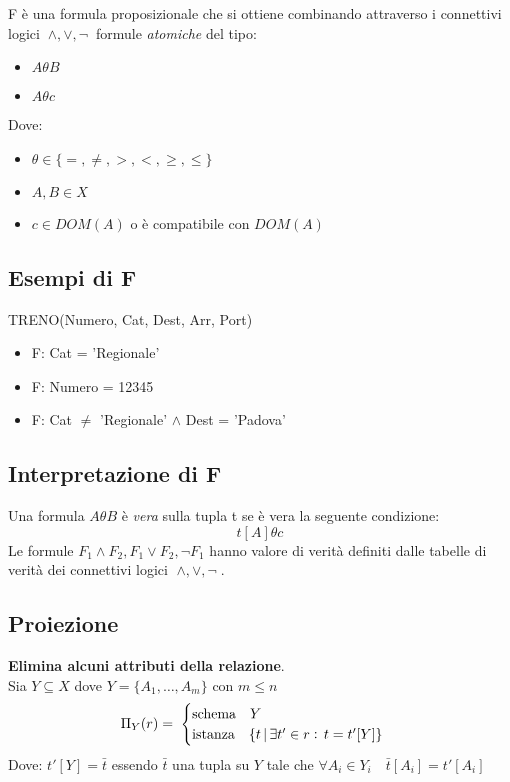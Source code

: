 \documentclass[a4paper, 10pt]{article}
\theoremstyle{definition}
\begin{document}
		F è una formula proposizionale che si ottiene combinando attraverso i connettivi logici $\: \wedge, \vee, \neg \:$ formule \emph{atomiche} del tipo:

			\begin{itemize}
				\item $A \theta B$
				\item $A \theta c$
			\end{itemize}		
			Dove:
			
			\begin{itemize}
				\item $\theta \in \{ =, \neq, >, <,  \geq, \leq \}$
				\item $A, B \in X$
				\item $c \in DOM(A)$ o è compatibile con $DOM(A)$
			\end{itemize}
			
		\subsection*{Esempi di F}
			TRENO(Numero, Cat, Dest, Arr, Port)
			
			\begin{itemize}
				\item F: Cat = 'Regionale'
				\item F: Numero = 12345
				\item F: Cat $\neq$ 'Regionale' $\wedge$ Dest = 'Padova'
			\end{itemize}
		\subsection*{Interpretazione di F}
			Una formula $A \theta B$ è \emph{vera} sulla tupla t se è vera la seguente condizione:
			\[
				t[A]\theta c
			\]
			Le formule $F_1\wedge F_2, F_1 \vee F_2, \neg F_1$ hanno  valore di verità definiti dalle tabelle di verità dei connettivi logici $\; \wedge, \vee, \neg \;$.
		
		\subsection*{Proiezione}
		
			\textbf{Elimina alcuni attributi della relazione}.\\
			Sia $Y \subseteq X$ dove $ Y=\{A_1, \dots , A_m \}$ con $m\leq n$
			\[
				\Pi_Y (r) = \;
				\begin{cases}
					\textup{schema} \quad Y \\
					\textup{istanza} \quad \{ t \, | \, \exists t' \in r : \, t = t'[Y]  \}
				\end{cases}
			\]
			Dove: $t'[Y] = \bar{t}$ essendo $\bar{t}$ una tupla su $Y$ tale che 
			$\forall A_i \in Y_i \quad \bar{t}[A_i] = t'[A_i]$
			
\end{document}
